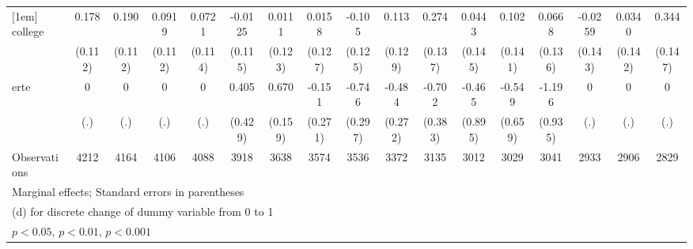 {\begin{tabular}{l*{16}{c}}
[1em]
college             &       0.178         &       0.190         &      0.0919         &      0.0721         &     -0.0125         &      0.0111         &      0.0158         &      -0.105         &       0.113         &       0.274\sym{*}  &      0.0443         &       0.102         &      0.0668         &     -0.0259         &      0.0340         &       0.344\sym{*}  \\
                    &     (0.112)         &     (0.112)         &     (0.112)         &     (0.114)         &     (0.115)         &     (0.123)         &     (0.127)         &     (0.125)         &     (0.129)         &     (0.137)         &     (0.145)         &     (0.141)         &     (0.136)         &     (0.143)         &     (0.142)         &     (0.147)         \\
[1em]
erte                &           0         &           0         &           0         &           0         &       0.405         &       0.670\sym{***}&      -0.151         &      -0.746\sym{*}  &      -0.484         &      -0.702         &      -0.465         &      -0.549         &      -1.196         &           0         &           0         &           0         \\
                    &         (.)         &         (.)         &         (.)         &         (.)         &     (0.429)         &     (0.159)         &     (0.271)         &     (0.297)         &     (0.272)         &     (0.383)         &     (0.895)         &     (0.659)         &     (0.935)         &         (.)         &         (.)         &         (.)         \\
\hline
Observations        &        4212         &        4164         &        4106         &        4088         &        3918         &        3638         &        3574         &        3536         &        3372         &        3135         &        3012         &        3029         &        3041         &        2933         &        2906         &        2829         \\
\hline\hline
\multicolumn{17}{l}{\footnotesize Marginal effects; Standard errors in parentheses}\\
\multicolumn{17}{l}{\footnotesize  (d) for discrete change of dummy variable from 0 to 1}\\
\multicolumn{17}{l}{\footnotesize \sym{*} \(p<0.05\), \sym{**} \(p<0.01\), \sym{***} \(p<0.001\)}\\
\end{tabular}
}
